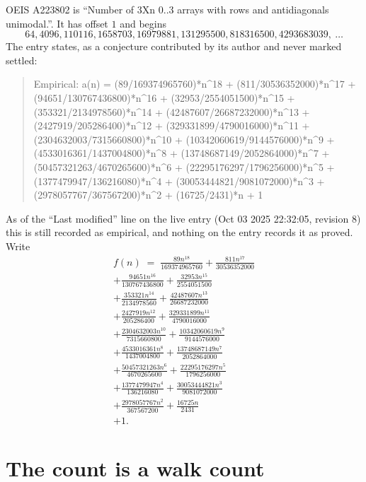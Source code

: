 \documentclass[11pt,a4paper]{article}
\theoremstyle{plain}
\theoremstyle{definition}
\begin{document}
OEIS A223802 is ``Number of 3Xn 0..3 arrays with rows and antidiagonals unimodal.''. It has offset $1$ and begins
\[
64, 4096, 110116, 1658703, 16979881, 131295500, 818316500, 4293683039,\ \dots
\]
The entry states, as a conjecture contributed by its author and never marked settled:
\begin{quote}\raggedright\small
Empirical: a(n) = (89/169374965760)*n\^{}18 + (811/30536352000)*n\^{}17 + (94651/130767436800)*n\^{}16 + (32953/2554051500)*n\^{}15 + (353321/2134978560)*n\^{}14 + (42487607/26687232000)*n\^{}13 + (2427919/205286400)*n\^{}12 + (329331899/4790016000)*n\^{}11 + (2304632003/7315660800)*n\^{}10 + (10342060619/9144576000)*n\^{}9 + (4533016361/1437004800)*n\^{}8 + (13748687149/2052864000)*n\^{}7 + (50457321263/4670265600)*n\^{}6 + (22295176297/1796256000)*n\^{}5 + (1377479947/136216080)*n\^{}4 + (30053444821/9081072000)*n\^{}3 + (2978057767/367567200)*n\^{}2 + (16725/2431)*n + 1
\end{quote}
As of the ``Last modified'' line on the live entry (Oct 03 2025 22:32:05, revision 8) this is still
recorded as empirical, and nothing on the entry records it as proved. Write
\begin{multline*}
f(n)\;=\;\frac{89 n^{18}}{169374965760} + \frac{811 n^{17}}{30536352000} \\
+ \frac{94651 n^{16}}{130767436800} + \frac{32953 n^{15}}{2554051500} \\
+ \frac{353321 n^{14}}{2134978560} + \frac{42487607 n^{13}}{26687232000} \\
+ \frac{2427919 n^{12}}{205286400} + \frac{329331899 n^{11}}{4790016000} \\
+ \frac{2304632003 n^{10}}{7315660800} + \frac{10342060619 n^{9}}{9144576000} \\
+ \frac{4533016361 n^{8}}{1437004800} + \frac{13748687149 n^{7}}{2052864000} \\
+ \frac{50457321263 n^{6}}{4670265600} + \frac{22295176297 n^{5}}{1796256000} \\
+ \frac{1377479947 n^{4}}{136216080} + \frac{30053444821 n^{3}}{9081072000} \\
+ \frac{2978057767 n^{2}}{367567200} + \frac{16725 n}{2431} \\
+ 1.
\end{multline*}

\section{The count is a walk count}
\end{document}
